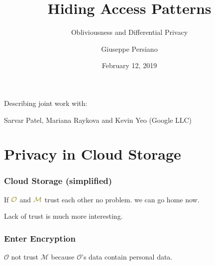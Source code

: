 \documentclass[]{beamer}
\title[]{Hiding Access Patterns}
\subtitle{Obliviousness and Differential Privacy}
\author{Giuseppe Persiano}
\institute[UNISA]{%
Universit\`a di Salerno\\ \qquad \\
}
\date[February 2019]{February 12, 2019}
\newcommand{\owner}{\mathcal{O}}
\newcommand{\manager}{\mathcal{M}}
\begin{document}
\newcommand{\zu}{\{0,1\}}
\newcommand{\ignore}[1]{}

\begin{frame}
  \titlepage

Describing joint work with:

Sarvar Patel, Mariana Raykova and Kevin Yeo (Google LLC)
\end{frame}



\frame{\tableofcontents}

\ignore{
    \begin{frame}
    \frametitle{Outline}
    \tableofcontents
    \end{frame}
}


\ignore{}{
\section{Privacy in Cloud Storage}
\begin{frame}
\frametitle{Cloud Storage (simplified)}


\pause

\vskip 1cm

{\color{blue} 
If $\color{olive}\owner$ and $\color{olive}\manager$ trust each other
}
\pause
\hfill {\color{purple} no problem. we can go home now.}

\pause\vfill
{\color{magenta} Lack of trust is much more interesting.}
\end{frame}

\begin{frame}
\frametitle{Enter Encryption}

{\color{purple}
$\owner$ 
not trust $\manager$ because $\owner$'s data contain personal data.
}


\end{frame}}
\end{document}
